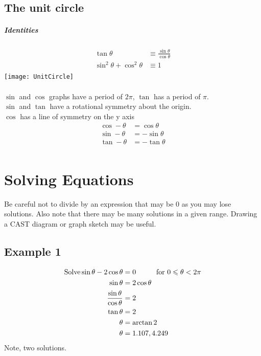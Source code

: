 \documentclass[class=article, crop=false]{standalone}
\begin{document}
\subsection*{The unit circle}
\subparagraph*{Identities}
\begin{align*}
\tan \theta & \equiv \frac{\sin \theta}{\cos \theta} \\
\sin^2 \theta + \cos^2 \theta & \equiv 1 \\
\end{align*}
\texttt{[image: UnitCircle]} \\\\
$\sin$ and $\cos$ graphs have a period of $2\pi$, $\tan$ has a period of $\pi$. \\
$\sin$ and $\tan$ have a rotational symmetry about the origin. \\
$\cos$ has a line of symmetry on the y axis \\
\begin{align*}
\cos - \theta & = \cos \theta \\
\sin - \theta & = - \sin \theta \\
\tan - \theta & = - \tan \theta \\ 
\end{align*}
\section*{Solving Equations}
Be careful not to divide by an expression that may be 0 as you may lose solutions. Also note that there may be many solutions in a given range. Drawing a CAST diagram or graph sketch may be useful.
\subsection*{Example 1}
\begin{align*}
\text{Solve} \sin \theta - 2 \cos \theta & = 0 \hspace*{1cm} \text{for } 0 \leqslant \theta < 2\pi \\
\sin \theta & = 2 \cos \theta \\
\frac{\sin \theta}{\cos \theta} & = 2 \\
\tan \theta & = 2 \\
\theta & = \arctan 2 \\
\theta & = 1.107, 4.249 \\
\end{align*}
Note, two solutions.
\end{document}
